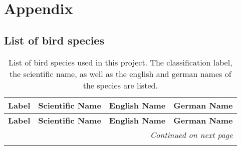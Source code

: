 \section{Appendix}
\label{sec:Appendix}

\subsection{List of bird species}
\label{sec:Appendix1}

\begin{longtable}{clll}
    \caption{List of bird species used in this project. The classification label, the scientific name, as well as the english and german names of the species are listed.} 
    \label{tab:species} \\
    \toprule
    \textbf{Label} & \textbf{Scientific Name} & \textbf{English Name} & \textbf{German Name} \\
    \midrule
    \endfirsthead
    
    \toprule
    \textbf{Label} & \textbf{Scientific Name} & \textbf{English Name} & \textbf{German Name} \\
    \midrule
    \endhead
    
    \midrule
    \multicolumn{4}{r}{\textit{Continued on next page}} \\
    \midrule
    \endfoot
    

\end{longtable}
